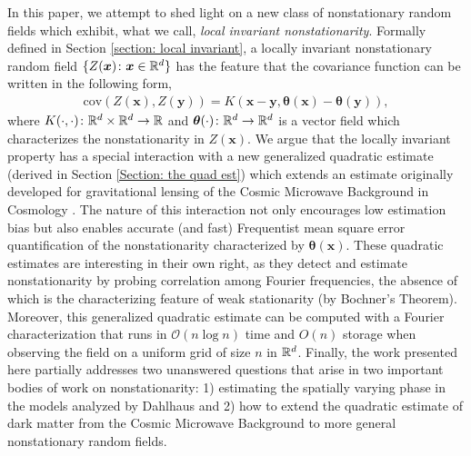 \documentclass[10pt,noinfoline]{imsart}
\newcommand{\bs}{\boldsymbol}
\begin{document}
In this paper, we attempt to shed light on a new class of nonstationary random fields which exhibit, what we call, {\em local invariant nonstationarity}. Formally defined in Section \ref{section: local invariant}, a locally invariant nonstationary random field $\{Z(\bs x)\colon \bs x\in \Bbb R^d\}$ has the feature that the covariance function can be written in the following form,
\begin{align*}
\text{cov}(Z(\bs x), Z(\bs y))=K(\bs x-\bs y, \bs \theta(\bs x)-\bs \theta(\bs y)),
\end{align*}
where $K(\cdot, \cdot)\colon \Bbb R^d\times \Bbb R^d \rightarrow \Bbb R$ and $\bs\theta(\cdot) \colon \Bbb R^d\rightarrow \Bbb R^d$ is a vector field which characterizes the nonstationarity in $Z(\bs x)$. We argue that the locally invariant property has a special interaction with a new  generalized quadratic estimate (derived in Section \ref{Section: the quad est}) which extends an estimate originally developed for gravitational lensing of the Cosmic Microwave Background in Cosmology \cite{hu2001mapping, hu2002mass}. The nature of this interaction not only encourages low estimation bias but also enables accurate (and fast) Frequentist mean square error quantification of the nonstationarity characterized by $\bs \theta(\bs x)$. These quadratic estimates are interesting in their own right, as they detect and estimate nonstationarity by probing correlation among Fourier frequencies, the absence of which is the characterizing feature of weak stationarity (by Bochner's Theorem). Moreover, this generalized quadratic estimate can be computed with a Fourier characterization that runs in $\mathcal O(n\log n)$ time and $O(n)$ storage when observing the field on a uniform grid of size $n$ in $\Bbb R^d $. Finally, the work presented here partially addresses two unanswered questions that arise in two important bodies of work on nonstationarity: 1) estimating the spatially varying phase in the models analyzed by Dahlhaus \cite{dahlhaus1997fitting,dahlhaus2000likelihood} and 2) how to extend the quadratic estimate of dark matter from the Cosmic Microwave Background to more general nonstationary random fields.
\end{document}
